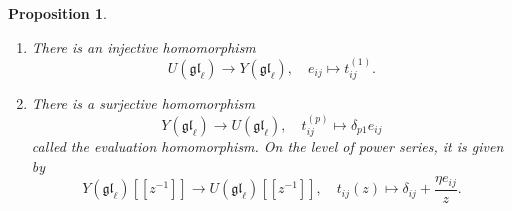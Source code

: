 \documentclass[11pt]{report}
\newtheorem{prop}[theorem]{Proposition}
\theoremstyle{definition}
\theoremstyle{remark}
\theoremstyle{remark}
\begin{document}
\begin{prop}
\begin{enumerate}[label=(\roman*)]
\item There is an injective homomorphism
\begin{equation*}
U(\mathfrak{gl}_\ell) \to Y(\mathfrak{gl}_\ell), \quad e_{ij} \mapsto t_{ij}^{(1)}.
\end{equation*}
\item There is a surjective homomorphism
\begin{equation*}
Y(\mathfrak{gl}_\ell) \to U(\mathfrak{gl}_\ell), \quad t_{ij}^{(p)} \mapsto \delta_{p1} e_{ij}
\end{equation*}
called the \emph{evaluation homomorphism}. On the level of power series, it is given by
\begin{equation*}
Y(\mathfrak{gl}_\ell)[[z^{-1}]] \to U(\mathfrak{gl}_\ell)[[z^{-1}]], \quad t_{ij}(z) \mapsto \delta_{ij} + \frac{\eta e_{ij}}{z}.
\end{equation*}
\end{enumerate}
\end{prop}
\end{document}
